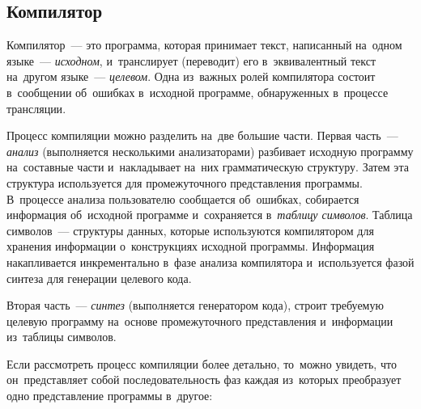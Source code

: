 \subsection{Компилятор} \label{sub111}

Компилятор~--- это программа, которая  принимает текст, написанный на~одном языке~--- \textit{исходном}, и~транслирует (переводит) его в~эквивалентный текст на~другом языке~--- \textit{целевом}. Одна из~важных ролей компилятора состоит в~сообщении об~ошибках в~исходной программе, обнаруженных в~процессе трансляции\cite{Aho2003}.

Процесс компиляции можно разделить на~две большие части. Первая часть~--- \textit{анализ} (выполняется несколькими анализаторами) разбивает исходную программу на~составные части и~накладывает на~них грамматическую структуру. Затем эта структура используется для промежуточного представления программы. В~процессе анализа пользователю сообщается об~ошибках, собирается информация об~исходной программе и~сохраняется в~\textit{таблицу символов}. Таблица символов~--- структуры данных, которые используются компилятором для хранения информации о~конструкциях исходной программы. Информация накапливается инкрементально в~фазе анализа компилятора и~используется фазой синтеза для генерации целевого кода.

Вторая часть~--- \textit{синтез} (выполняется генератором кода), строит требуемую целевую программу на~основе промежуточного представления и~информации из~таблицы символов.

Если рассмотреть процесс компиляции более детально, то~можно увидеть, что он~представляет собой последовательность фаз каждая из~которых преобразует одно представление программы в~другое:

